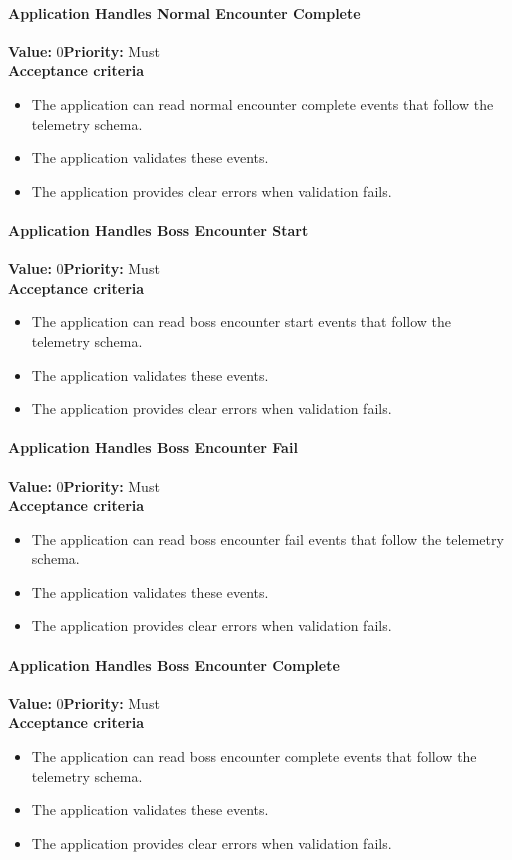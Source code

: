 \paragraph{Application Handles Normal Encounter Complete}
\textbf{Value:} 0\quad \textbf{Priority:} Must\\
\textbf{Acceptance criteria}
\begin{itemize}
  \item The application can read normal encounter complete events that follow the telemetry schema.
  \item The application validates these events.
  \item The application provides clear errors when validation fails.
\end{itemize}

\paragraph{Application Handles Boss Encounter Start}
\textbf{Value:} 0\quad \textbf{Priority:} Must\\
\textbf{Acceptance criteria}
\begin{itemize}
  \item The application can read boss encounter start events that follow the telemetry schema.
  \item The application validates these events.
  \item The application provides clear errors when validation fails.
\end{itemize}

\paragraph{Application Handles Boss Encounter Fail}
\textbf{Value:} 0\quad \textbf{Priority:} Must\\
\textbf{Acceptance criteria}
\begin{itemize}
  \item The application can read boss encounter fail events that follow the telemetry schema.
  \item The application validates these events.
  \item The application provides clear errors when validation fails.
\end{itemize}

\paragraph{Application Handles Boss Encounter Complete}
\textbf{Value:} 0\quad \textbf{Priority:} Must\\
\textbf{Acceptance criteria}
\begin{itemize}
  \item The application can read boss encounter complete events that follow the telemetry schema.
  \item The application validates these events.
  \item The application provides clear errors when validation fails.
\end{itemize}

